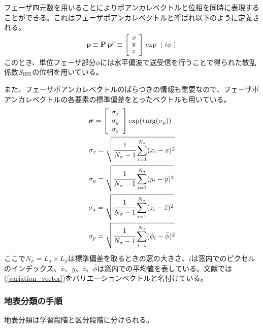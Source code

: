 \documentclass[a4j, twocolumn]{jsarticle}
\begin{document}
フェーザ四元数を用いることによりポアンカレベクトルと位相を同時に表現することができる。これはフェーザポアンカレベクトルと呼ばれ以下のように定義される。
\begin{eqnarray}
	\label{p}
	\bm{p} \equiv \bm{P}\:\bm{p}^{p} \equiv 
	\left[
	\begin{array}{c}
		x\\
		y\\
		z
	\end{array}
	\right]\exp({i\phi})
\end{eqnarray}
このとき、単位フェーザ部分$\phi$には水平偏波で送受信を行うことで得られた散乱係数$S_{\rm{HH}}$の位相を用いている。

また、フェーザポアンカレベクトルのばらつきの情報も重要なので、フェーザポアンカレベクトルの各要素の標準偏差をとったベクトルも用いている。
\begin{align}\label{variation_vector}
&\mbox{\boldmath $\sigma$}
=
\left[
\begin{array}{c}
\sigma_{x}\\
\sigma_{y}\\
\sigma_{z}
\end{array}
\right]\exp({i\arg(\sigma_{p})})\\
&\sigma_{x}=\sqrt{\cfrac{1}{N_{\sigma}-1}\sum_{i=1}^{N_{\sigma}}(x_{i}-\bar{x})^{2}} \nonumber\\
&\sigma_{y}=\sqrt{\cfrac{1}{N_{\sigma}-1}\sum_{i=1}^{N_{\sigma}}(y_{i}-\bar{y})^{2}} \nonumber\\
&\sigma_{z}=\sqrt{\cfrac{1}{N_{\sigma}-1}\sum_{i=1}^{N_{\sigma}}(z_{i}-\bar{z})^{2}} \nonumber\\
&\sigma_{p}=\sqrt{\cfrac{1}{N_{\sigma}-1}\sum_{i=1}^{N_{\sigma}}(\phi_{i}-\bar{\phi})^{2}} \nonumber
\end{align}
ここで$N_{\sigma} = L_{\sigma}\times L_{\sigma}$は標準偏差を取るときの窓の大きさ、$i$は窓内でのピクセルのインデックス、$\bar{x}$、$\bar{y}$、$\bar{z}$、$\bar{\phi}$は窓内での平均値を表している。文献\cite{shang2013polsar,shang2014quaternion}では(\ref{variation_vector})をバリエーションベクトルと名付けている。

\subsubsection{地表分類の手順}
地表分類は学習段階と区分段階に分けられる。
\end{document}
